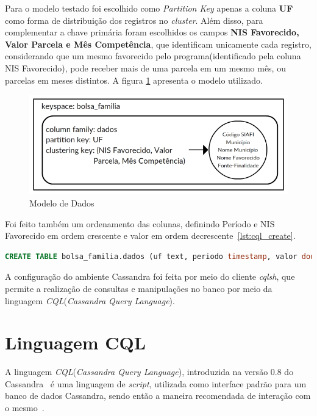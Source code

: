 Para o modelo testado foi escolhido como \emph{Partition Key} apenas a coluna \textbf{UF} como forma de distribuição dos registros no \emph{cluster}. Além disso, para complementar a chave primária foram escolhidos os campos \textbf{NIS Favorecido, Valor Parcela e Mês Competência}, que identificam unicamente cada registro, considerando que um mesmo favorecido pelo programa(identificado pela coluna NIS Favorecido), pode receber mais de uma parcela em um mesmo mês, ou parcelas em meses distintos. A figura \ref{fig:modelocassandra} apresenta o modelo utilizado.

\begin{figure}[!htb]
	\centering
	\includegraphics[width=1\textwidth]{figuras/modelocassandra.png}
	\caption{Modelo de Dados}
	\label{fig:modelocassandra}
\end{figure}

Foi feito também um ordenamento das colunas, definindo Período e NIS Favorecido em ordem crescente e valor em ordem decrescente~\ref{lst:cql_create}. 

\begin{lstlisting}[caption={Código CQL criação da tabela},label={lst:cql_create},language=SQL]
CREATE TABLE bolsa_familia.dados (uf text, periodo timestamp, valor double, nis_favorecido bigint, cod_municipio int, fonte text, nome_favorecido text, nome_municipio text, PRIMARY KEY(uf, periodo, valor, nis_favorecido)) WITH CLUSTERING ORDER BY(periodo ASC, valor DESC, nis_favorecido ASC);
\end{lstlisting}

A configuração do ambiente Cassandra foi feita por meio do cliente \emph{cqlsh}, que permite a realização de consultas e manipulações no banco por meio da linguagem \emph{CQL}(\emph{Cassandra Query Language}).

\section{Linguagem CQL}
A linguagem \emph{CQL}(\emph{Cassandra Query Language}), introduzida na versão 0.8 do Cassandra~\cite{cassandra08} é uma linguagem de \emph{script}, utilizada como interface padrão para um banco de dados Cassandra, sendo então a maneira recomendada de interação com o mesmo~\cite{cassandracql}. 


